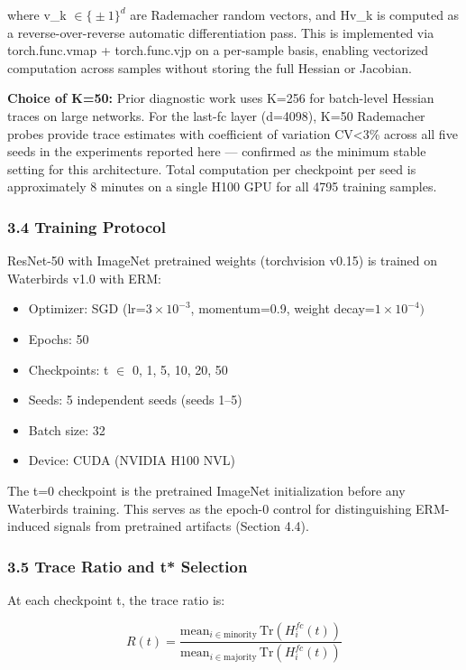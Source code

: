 where v\_k $\in \bigl\{\pm 1\bigr\}^d$ are Rademacher random vectors, and Hv\_k is computed as a reverse-over-reverse automatic differentiation pass. This is implemented via torch.func.vmap + torch.func.vjp on a per-sample basis, enabling vectorized computation across samples without storing the full Hessian or Jacobian.

\textbf{Choice of K=50:} Prior diagnostic work \citep{yao2020pyhessian} uses K=256 for batch-level Hessian traces on large networks. For the last-fc layer (d=4098), K=50 Rademacher probes provide trace estimates with coefficient of variation CV<3\% across all five seeds in the experiments reported here --- confirmed as the minimum stable setting for this architecture. Total computation per checkpoint per seed is approximately 8 minutes on a single H100 GPU for all 4795 training samples.

\subsubsection{3.4 Training Protocol}

ResNet-50 \citep{he2016deep} with ImageNet pretrained weights (torchvision v0.15) is trained on Waterbirds v1.0 with ERM:

\begin{itemize}
\item Optimizer: SGD (lr=$3\times 10^{-3}$, momentum=0.9, weight decay=$1\times 10^{-4})$
\item Epochs: 50
\item Checkpoints: t $\in$ {0, 1, 5, 10, 20, 50}
\item Seeds: 5 independent seeds (seeds 1--5)
\item Batch size: 32
\item Device: CUDA (NVIDIA H100 NVL)
\end{itemize}

The t=0 checkpoint is the pretrained ImageNet initialization before any Waterbirds training. This serves as the epoch-0 control for distinguishing ERM-induced signals from pretrained artifacts (Section 4.4).

\subsubsection{3.5 Trace Ratio and t* Selection}

At each checkpoint t, the trace ratio is:

$$R(t) = \frac{\mathrm{mean}_{i\in\mathrm{minority}}\, \mathrm{Tr}(H_i^{fc}(t))}{\mathrm{mean}_{i\in\mathrm{majority}}\, \mathrm{Tr}(H_i^{fc}(t))}$$

